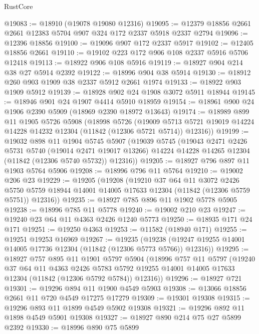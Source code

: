 \begin{lexlean}{RustCore}
\begin{coremodule}
@19083 := @18910 (@19078 @19080 @12316)
@19095 := @12379 @18856 @2661 @2661 @12383 @5704 @907 @324 @172 @2337 @5918 @2337 @2794
@19096 := @12396 @18856
@19100 := @19096 @907 @172 @2337 @5917
@19102 := @12405 @18856 @2661
@19110 := @19102 @223 @172 @906 @108 @2337 @5916 @5706 @12418
@19113 := @18922 @906 @108 @5916
@19119 := @18927 @904 @214 @38 @27 @5914 @2392
@19122 := @18996 @904 @38 @5914
@19130 := @18912 @260 @903 @1909 @38 @2337 @5912 @2661 @1974
@19133 := @18922 @903 @1909 @5912
@19139 := @18928 @902 @24 @1908 @3072 @5911 @18944
@19145 := @18946 @901 @24 @1907 @4414 @5910 @18959
@19154 := @18961 @900 @24 @1906 @2390 @5909 (@18969 @2390 @18972 @13643)
@19174 := @18989
    @899
    @11
    @1905
    @5726
    @5908
    (@18998
      @5726
      (@19009 @5713 @5721 @19019 @14224 @14228 @14232 @12304 (@11842 (@12306 @5721 @5714)) @12316))
@19199 := @19032
    @898
    @11
    @1904
    @5745
    @5907
    (@19039
      @5745
      (@19043
        @2471
        @2426
        @5731
        @5740
        (@19014 @2471 @19017 @13266)
        @14224
        @14228
        @14265
        @12304
        (@11842 (@12306 @5740 @5732))
        @12316))
@19205 := @18927 @796 @897 @11 @1903 @5764 @5906
@19208 := @18996 @796 @11 @5764
@19210 := @19002 @206 @23
@19229 := @19205
    (@19208
      (@19210
        @37
        @64
        @11
        @3072
        @2426
        @5750
        @5759
        @18944
        @14001
        @14005
        @17633
        @12304
        (@11842 (@12306 @5759 @5751))
        @12316))
@19235 := @18927 @785 @896 @11 @1902 @5778 @5905
@19238 := @18996 @785 @11 @5778
@19240 := @19002 @210 @23
@19247 := @19240 @23 @64 @11 @4363 @2426 @1240 @5773
@19250 := @18935 @171 @24 @171
@19251 := @19250 @4363
@19253 := @11582 (@18940 @171)
@19255 := @19251 @19253 @16969
@19267 := @19235
    (@19238 (@19247 @19255 @14001 @14005 @17736 @12304 (@11842 (@12306 @5773 @5766)) @12316))
@19295 := @18927
    @757
    @895
    @11
    @1901
    @5797
    @5904
    (@18996
      @757
      @11
      @5797
      (@19240
        @37
        @64
        @11
        @4363
        @2426
        @5783
        @5792
        @19255
        @14001
        @14005
        @17633
        @12304
        (@11842 (@12306 @5792 @5784))
        @12316))
@19296 := @18927 @721
@19301 := @19296 @894 @11 @1900 @4549 @5903
@19308 := @13066 @18856 @2661 @11 @720 @4549 @17275 @17279
@19309 := @19301 @19308
@19315 := @19296 @893 @11 @1899 @4549 @5902 @19308
@19321 := @19296 @892 @11 @1898 @4549 @5901 @19308
@19327 := @18927 @890 @214 @75 @27 @5899 @2392
@19330 := @18996 @890 @75 @5899

\end{coremodule}
\end{lexlean}
